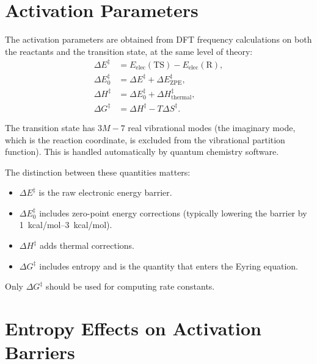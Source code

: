 \documentclass[11pt]{article}
\numberwithin{equation}{section}
\begin{document}
\section{Activation Parameters}
\label{sec:activation}

The activation parameters are obtained from DFT frequency calculations on both the reactants and the transition state, at the same level of theory:
\begin{align}
\Delta E^\ddagger &= E_\text{elec}(\text{TS}) - E_\text{elec}(\text{R}), \label{eq:dEddagger}\\
\Delta E_0^\ddagger &= \Delta E^\ddagger + \Delta E_\text{ZPE}^\ddagger, \label{eq:dE0ddagger}\\
\Delta H^\ddagger &= \Delta E_0^\ddagger + \Delta H_\text{thermal}^\ddagger, \label{eq:dHddagger}\\
\Delta G^\ddagger &= \Delta H^\ddagger - T\Delta S^\ddagger. \label{eq:dGddagger}
\end{align}

The transition state has $3M-7$ real vibrational modes (the imaginary mode, which is the reaction coordinate, is excluded from the vibrational partition function). This is handled automatically by quantum chemistry software.

The distinction between these quantities matters:
\begin{itemize}
\item $\Delta E^\ddagger$ is the raw electronic energy barrier.
\item $\Delta E_0^\ddagger$ includes zero-point energy corrections (typically lowering the barrier by \SIrange{1}{3}{kcal/mol}).
\item $\Delta H^\ddagger$ adds thermal corrections.
\item $\Delta G^\ddagger$ includes entropy and is the quantity that enters the Eyring equation.
\end{itemize}

Only $\Delta G^\ddagger$ should be used for computing rate constants.


\section{Entropy Effects on Activation Barriers}
\label{sec:entropy}
\end{document}
